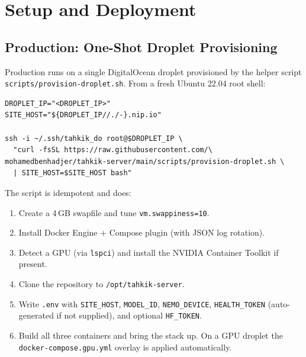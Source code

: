 \chapter{Setup and Deployment}

\section{Production: One-Shot Droplet Provisioning}

Production runs on a single DigitalOcean droplet provisioned by the helper script \texttt{scripts/}\linebreak[1]\texttt{provision-droplet.sh}. From a fresh Ubuntu 22.04 root shell:

\begin{infobox}[title=Provisioning Command]
\begin{verbatim}
DROPLET_IP="<DROPLET_IP>"
SITE_HOST="${DROPLET_IP//./-}.nip.io"

ssh -i ~/.ssh/tahkik_do root@$DROPLET_IP \
  "curl -fsSL https://raw.githubusercontent.com/\
mohamedbenhadjer/tahkik-server/main/scripts/provision-droplet.sh \
  | SITE_HOST=$SITE_HOST bash"
\end{verbatim}
\end{infobox}

The script is idempotent and does:

\begin{enumerate}
  \item Create a 4\,GB swapfile and tune \texttt{vm.swappiness=10}.
  \item Install Docker Engine + Compose plugin (with JSON log rotation).
  \item Detect a GPU (via \texttt{lspci}) and install the NVIDIA Container Toolkit if present.
  \item Clone the repository to \texttt{/opt/tahkik-server}.
  \item Write \texttt{.env} with \texttt{SITE\_HOST}, \texttt{MODEL\_ID}, \texttt{NEMO\_DEVICE}, \texttt{HEALTH\_TOKEN} (auto-generated if not supplied), and optional \texttt{HF\_TOKEN}.
  \item Build all three containers and bring the stack up. On a GPU droplet the \texttt{docker-compose.gpu.yml} overlay is applied automatically.
\end{enumerate}

